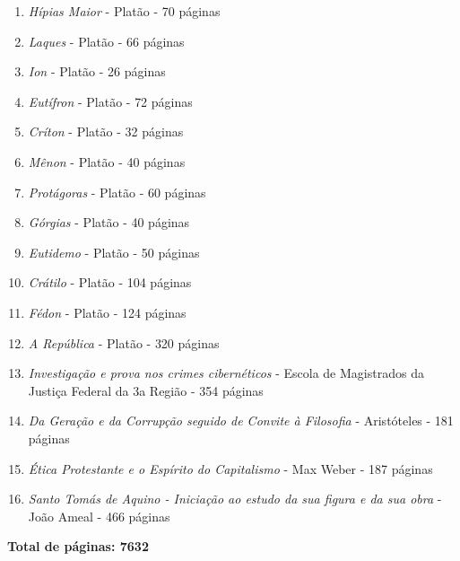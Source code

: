 \documentclass[a4paper, twoside]{article}
\begin{document}
\begin{enumerate}
\item{\emph{Hípias Maior} - Platão - 70 páginas}
\item{\emph{Laques} - Platão - 66 páginas}
\item{\emph{Ion} - Platão - 26 páginas}
\item{\emph{Eutífron} - Platão - 72 páginas}
\item{\emph{Críton} - Platão - 32 páginas}
\item{\emph{Mênon} - Platão - 40 páginas}
\item{\emph{Protágoras} - Platão - 60 páginas}
\item{\emph{Górgias} - Platão - 40 páginas}
\item{\emph{Eutidemo} - Platão - 50 páginas}
\item{\emph{Crátilo} - Platão - 104 páginas}
\item{\emph{Fédon} - Platão - 124 páginas}
\item{\emph{A República} - Platão - 320 páginas}
\item{\emph{Investigação e prova nos crimes cibernéticos} - Escola de Magistrados da Justiça Federal da 3a Região - 354 páginas}
\item{\emph{Da Geração e da Corrupção seguido de Convite à Filosofia} - Aristóteles - 181 páginas}
\item{\emph{Ética Protestante e o Espírito do Capitalismo} - Max Weber - 187 páginas}
\item{\emph{Santo Tomás de Aquino - Iniciação ao estudo da sua figura e da sua obra} - João Ameal - 466 páginas}
\end{enumerate}
\begin{center}
\textbf{Total de páginas: 7632}
\end{center}
\end{document}
